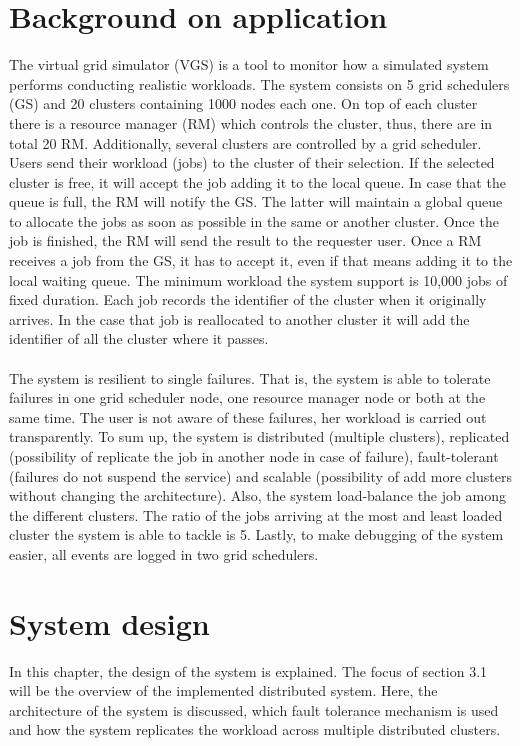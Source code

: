 \documentclass{article}
\begin{document}
\section{Background on application}
The virtual grid simulator (VGS) is a tool to monitor how a simulated system performs conducting realistic workloads. The system consists on 5 grid schedulers (GS) and 20 clusters containing 1000 nodes each one. On top of each cluster there is a resource manager (RM) which controls the cluster, thus, there are in total 20 RM. Additionally, several clusters are controlled by a grid scheduler. Users send their workload (jobs) to the cluster of their selection. If the selected cluster is free, it will accept the job adding it to the local queue. In case that the queue is full, the RM will notify the GS. The latter will maintain a global queue to allocate the jobs as soon as possible in the same or another cluster. Once the job is finished, the RM will send the result to the requester user. Once a RM receives a job from the GS, it has to accept it, even if that means adding it to the local waiting queue. The minimum workload the system support is 10,000 jobs of fixed duration. Each job records the identifier of the cluster when it originally arrives. In the case that job is reallocated to another cluster it will add the identifier of all the cluster where it passes.
\\\\
The system is resilient to single failures. That is, the system is able to tolerate failures in one grid scheduler node, one resource manager node or both at the same time. The user is not aware of these failures, her workload is carried out transparently. To sum up, the system is distributed (multiple clusters), replicated (possibility of replicate the job in another node in case of failure), fault-tolerant (failures do not suspend the service) and scalable (possibility of add more clusters without changing the architecture). Also, the system load-balance the job among the different clusters. The ratio of the jobs arriving at the most and least loaded cluster the system is able to tackle is 5. Lastly, to make debugging of the system easier, all events are logged in two grid schedulers.
 
\section{System design}
In this chapter, the design of the system is explained. The focus of section 3.1 will be the overview of the implemented distributed system. Here, the architecture of the system is discussed, which fault tolerance mechanism is used and how the system replicates the workload across multiple distributed clusters.
\end{document}
